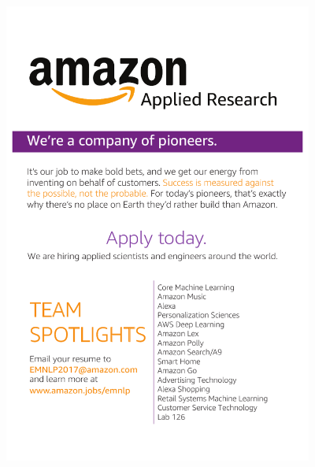 \thispagestyle{empty}
\begin{center}
  \vfill
  \includegraphics[width=4in]{content/ads/platinum/amazon.pdf}
  \vfill
\end{center}
\clearpage


